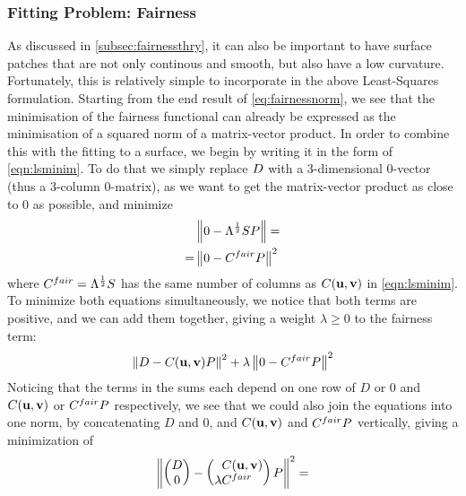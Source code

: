 \subsubsection{Fitting Problem: Fairness}
As discussed in \autoref{subsec:fairnessthry}, it can also be important to have surface patches that are not only continous and smooth, but also have a low curvature. Fortunately, this is relatively simple to incorporate in the above Least-Squares formulation. Starting from the end result of \autoref{eq:fairnessnorm}, we see that the minimisation of the fairness functional can already be expressed as the minimisation of a squared norm of a matrix-vector product. In order to combine this with the fitting to a surface, we begin by writing it in the form of \autoref{eqn:lsminim}. To do that we simply replace $\lsDataPointMatrix$ with a 3-dimensional $0$-vector (thus a 3-column $0$-matrix), as we want to get the matrix-vector product as close to $0$ as possible, and minimize
\begin{align*}
\phantom{=}& \norm{0 - \Lambda^{\frac{1}{2}} S \lsControlPointMatrix} =
\\
=& \norm{0 - \lsControlPointCoefMatrix^{fair}\lsControlPointMatrix}^2
\end{align*}
where $\lsControlPointCoefMatrix^{fair} = \Lambda^{\frac{1}{2}} S$ has the same number of columns as $\lsControlPointCoefMatrix(\vec{u},\vec{v})$ in \autoref{eqn:lsminim}. %
To minimize both equations simultaneously, we notice that both terms are positive, and we can add them together, giving a weight $\lambda \geq 0$ to the fairness term:
\begin{equation}
\norm{\lsDataPointMatrix - \lsControlPointCoefMatrix(\vec{u},\vec{v}) \lsControlPointMatrix }^2 + \lambda \norm{0 - \lsControlPointCoefMatrix^{fair}\lsControlPointMatrix }^2
\end{equation}
Noticing that the terms in the sums each depend on one row of $D$ or $0$ and $\lsControlPointCoefMatrix(\vec{u},\vec{v})$ or $\lsControlPointCoefMatrix^{fair}\lsControlPointMatrix$ respectively, we see that we could also join the equations into one norm, by concatenating $D$ and $0$, and $\lsControlPointCoefMatrix(\vec{u},\vec{v})$ and $\lsControlPointCoefMatrix^{fair}\lsControlPointMatrix$ vertically, giving a minimization of
\begin{equation*}
\norm{
\begin{pmatrix}
\lsDataPointMatrix \\ 0
\end{pmatrix} -
\begin{pmatrix*}[l]
\phantom{\lambda}\lsControlPointCoefMatrix(\vec{u},\vec{v}) \\ \lambda \lsControlPointCoefMatrix^{fair}
\end{pmatrix*}
\lsControlPointMatrix 
}^2 =
\end{equation*}
